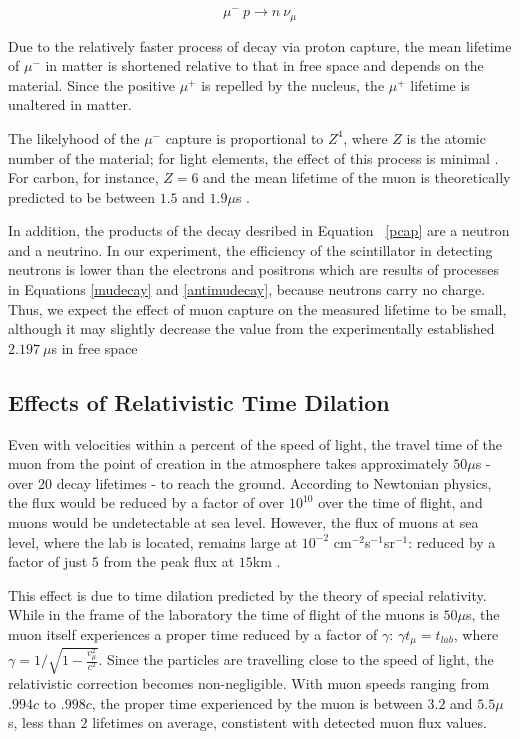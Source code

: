 \begin{equation}\mu^-~p \rightarrow n~\nu_{\mu} \label{pcap} \end{equation}

Due to the relatively faster process of decay via proton capture, the
mean lifetime of $\mu^-$ in matter is shortened relative to that in
free space and depends on the material. Since the positive $\mu^+$ is
repelled by the nucleus, the $\mu^+$ lifetime is unaltered in matter.

The likelyhood of the $\mu^-$ capture is proportional to $Z^4$, where
$Z$ is the atomic number of the material; for light elements, the
effect of this process is minimal \cite[p.172]{rossi}. For carbon, for
instance, $Z=6$ and the mean lifetime of the muon is theoretically
predicted to be between $1.5$ and $1.9\mu$s \cite[p.~170]{rossi}.

In addition, the products of the decay desribed in Equation
~\eqref{pcap} are a neutron and a neutrino. In our experiment, the
efficiency of the scintillator in detecting neutrons is lower than the
electrons and positrons which are results of processes in Equations
\eqref{mudecay} and \eqref{antimudecay}, because neutrons carry no
charge. Thus, we expect the effect of muon capture on the measured
lifetime to be small, although it may slightly decrease the value from
the experimentally established $2.197~\mu$s in free space \cite{pdg}

\subsection{Effects of Relativistic Time Dilation}

Even with velocities within a percent of the speed of light, the
travel time of the muon from the point of creation in the atmosphere
takes approximately $50\mu$s - over 20 decay lifetimes - to reach the
ground. According to Newtonian physics, the flux would be reduced by a
factor of over $10^{10}$ over the time of flight, and muons would be
undetectable at sea level. However, the flux of muons at sea level,
where the lab is located, remains large at $10^{-2}$
cm$^{-2}$s$^{-1}$sr$^{-1}$: reduced by a factor of just $5$ from the
peak flux at $15$km \cite{rossi}.

This effect is due to time dilation predicted by the theory of special
relativity. While in the frame of the laboratory the time of flight of
the muons is $50\mu$s, the muon itself experiences a proper time
reduced by a factor of $\gamma$: $ \gamma t_{\mu} = t_{lab}$, where
$\gamma = 1/\sqrt{1 - \frac{v_{\mu}^2}{c^2}}$. Since the particles are
travelling close to the speed of light, the relativistic correction
becomes non-negligible. With muon speeds ranging from $.994c$ to
$.998c$, the proper time experienced by the muon is between $3.2$ and
$5.5\mu$s, less than $2$ lifetimes on average, constistent with
detected muon flux values.

